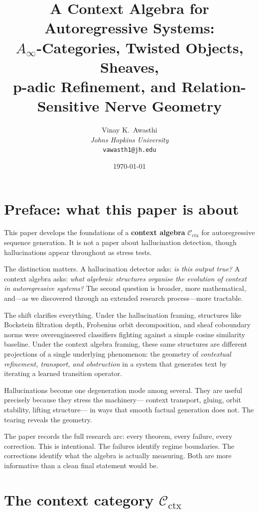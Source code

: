 \documentclass[11pt]{amsart}
\title[A Context Algebra for Autoregressive Systems]{%
  A Context Algebra for Autoregressive Systems:\\[2pt]
  $A_\infty$-Categories, Twisted Objects, Sheaves,\\
  p-adic Refinement, and Relation-Sensitive Nerve Geometry}
\author{Vinay K.\ Awasthi\\
\textit{Johns Hopkins University}\\
\texttt{vawasth1@jh.edu}}
\date{\today}
\theoremstyle{definition}
\newcommand{\Cctx}{\mathcal{C}_{\!\mathrm{ctx}}}
\begin{document}
\maketitle
\tableofcontents

\section*{Preface: what this paper is about}

This paper develops the foundations of a \textbf{context algebra}
$\Cctx$ for autoregressive sequence generation.
It is not a paper about hallucination detection,
though hallucinations appear throughout as stress tests.

The distinction matters.
A hallucination detector asks: \emph{is this output true?}
A context algebra asks: \emph{what algebraic structures organise
the evolution of context in autoregressive systems?}
The second question is broader, more mathematical, and---as we discovered
through an extended research process---more tractable.

The shift clarifies everything.
Under the hallucination framing, structures like Bockstein filtration
depth, Frobenius orbit decomposition, and sheaf coboundary norms
were overengineered classifiers fighting against a simple cosine
similarity baseline.
Under the context algebra framing, these same structures are different
projections of a single underlying phenomenon: the geometry of
\emph{contextual refinement, transport, and obstruction} in a system
that generates text by iterating a learned transition operator.

Hallucinations become one degeneration mode among several.
They are useful precisely because they stress the machinery---
context transport, gluing, orbit stability, lifting structure---
in ways that smooth factual generation does not.
The tearing reveals the geometry.

The paper records the full research arc: every theorem, every failure,
every correction.
This is intentional.
The failures identify regime boundaries.
The corrections identify what the algebra is actually measuring.
Both are more informative than a clean final statement would be.

\section{The context category $\Cctx$}
\label{sec:category}
\end{document}
